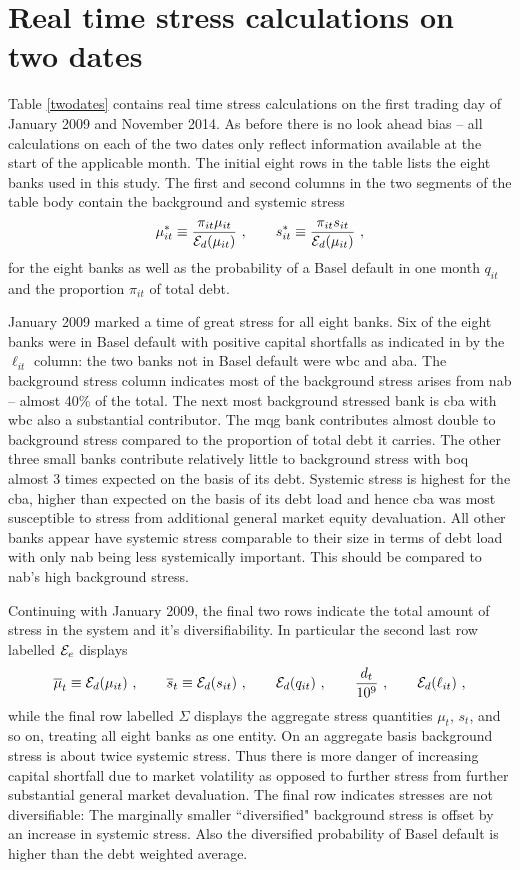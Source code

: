 \documentclass[authoryear]{elsarticle}
\newcommand{\Ex}{{\cal E}}
\newcommand{\tref}[1]{Table \ref{#1}}
\newcommand{\cq}{\ , \qquad}
\begin{document}
\section*{Real time stress calculations on two dates}
 \tref{twodates} contains real time stress calculations on the first trading day of  January 2009 and November 2014.  As before there is no look ahead bias -- all calculations on each of the two dates only reflect information available at the start of the applicable month.  The initial eight rows in the table lists the eight banks used in this study.   The first  and second columns in the two segments of the table body contain the background and systemic stress
$$
\mu^*_{it} \equiv \frac{\pi_{it}\mu_{it}}{\Ex_d(\mu_{it})}\cq s^*_{it} \equiv \frac{\pi_{it}s_{it}}{\Ex_d(\mu_{it})}\ , 
$$
for the eight banks as well as the probability of a Basel default in one month $q_{it}$ and the proportion $\pi_{it}$ of total debt.

January 2009 marked a time of great stress for all eight banks.    Six of the eight banks were in Basel default with positive capital shortfalls as indicated in by the $\ell_{it}$ column:   the two banks not in Basel default were wbc and aba.   The background stress column indicates most of the background stress arises from nab -- almost 40\% of the total.   The next most background stressed bank is cba with wbc also a substantial contributor.   The mqg bank contributes almost double to background stress compared to the proportion of total debt  it carries.  The other three small banks contribute relatively little to background stress with boq  almost 3 times expected on the basis of its debt.   Systemic stress is highest for the cba, higher than expected on the basis of its debt load and hence cba was most susceptible to stress from additional general market equity devaluation.    All other banks appear have systemic stress comparable to their size in terms of debt load with only nab being less systemically important.    This should be compared to nab's high background stress.

Continuing with January 2009, the final two rows indicate the total amount of stress in the system and it's diversifiability.   In particular 
the second last  row labelled $\Ex_e$  displays
$$
\overline{\mu}_t\equiv \Ex_d(\mu_{it})\cq \overline{s}_t\equiv\Ex_d(s_{it})\cq\Ex_d(q_{it})\cq \frac{d_t}{10^9}\cq \Ex_d(\ell_{it})\ ,
$$
while the final row labelled $\Sigma$ displays the aggregate stress quantities $\mu_t$, $s_t$, and so on, treating all eight banks as one entity.
On an aggregate basis background stress is about twice systemic stress.   Thus there is more danger of increasing capital shortfall due to market volatility  as opposed to further stress from further substantial general market devaluation.  The final row indicates stresses are not diversifiable:    The marginally  smaller  ``diversified"  background stress is offset by an increase in systemic stress.    Also the diversified probability of Basel default is higher than the debt weighted average.   
\end{document}
